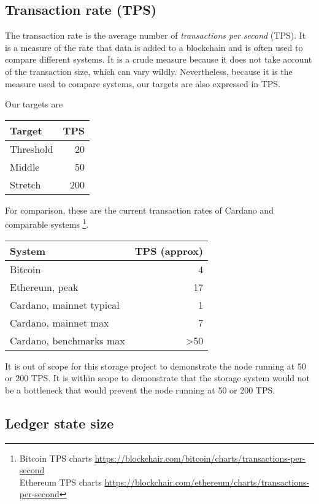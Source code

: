 \documentclass[11pt,a4paper]{article}
\begin{document}
\subsection{Transaction rate (TPS)}
\label{requirements-tps}

The transaction rate is the average number of \emph{transactions per second}
(TPS). It is a measure of the rate that data is added to a blockchain and is
often used to compare different systems. It is a crude measure because it does
not take account of the transaction size, which can vary wildly. Nevertheless,
because it is the measure used to compare systems, our targets are also
expressed in TPS.

Our targets are

\begin{center}
\begin{tabular}[]{lr}
  Target    & TPS \\
  \toprule
  Threshold &  20 \\
  Middle    &  50 \\
  Stretch   & 200
\end{tabular}
\end{center}
%
For comparison, these are the current transaction rates of Cardano and
comparable systems%
\footnote{Bitcoin TPS charts \url{https://blockchair.com/bitcoin/charts/transactions-per-second}\\
Ethereum TPS charts \url{https://blockchair.com/ethereum/charts/transactions-per-second}}.

\begin{center}
\begin{tabular}[]{lr}
  System    & TPS (approx) \\
  \toprule
  Bitcoin                  & 4   \\
  Ethereum, peak           & 17  \\
  Cardano, mainnet typical & 1   \\
  Cardano, mainnet max     & 7   \\
  Cardano, benchmarks max  & \textgreater 50   \\
\end{tabular}
\end{center}

It is out of scope for this storage project to demonstrate the node running at
50 or 200 TPS. It is within scope to demonstrate that the storage system would
not be a bottleneck that would prevent the node running at 50 or 200 TPS.

\subsection{Ledger state size}
\label{ledger-state-size}
\end{document}
